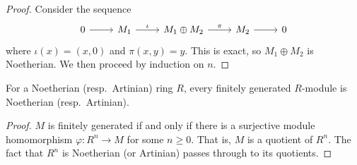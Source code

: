 \begin{proof}
    Consider the sequence
    \[\begin{tikzcd}
        0 & {M_1} & {M_1 \oplus M_2} & {M_2} & 0
        \arrow[from=1-1, to=1-2]
        \arrow["\iota", from=1-2, to=1-3]
        \arrow["\pi", from=1-3, to=1-4]
        \arrow[from=1-4, to=1-5]
    \end{tikzcd}\]
    where \( \iota(x) = (x, 0) \) and \( \pi(x, y) = y \).
    This is exact, so \( M_1 \oplus M_2 \) is Noetherian.
    We then proceed by induction on \( n \).
\end{proof}
\begin{proposition}
    For a Noetherian (resp.\ Artinian) ring \( R \), every finitely generated \( R \)-module is Noetherian (resp.\ Artinian).
\end{proposition}
\begin{proof}
    \( M \) is finitely generated if and only if there is a surjective module homomorphism \( \varphi : R^n \to M \) for some \( n \geq 0 \).
    That is, \( M \) is a quotient of \( R^n \).
    The fact that \( R^n \) is Noetherian (or Artinian) passes through to its quotients.
\end{proof}


